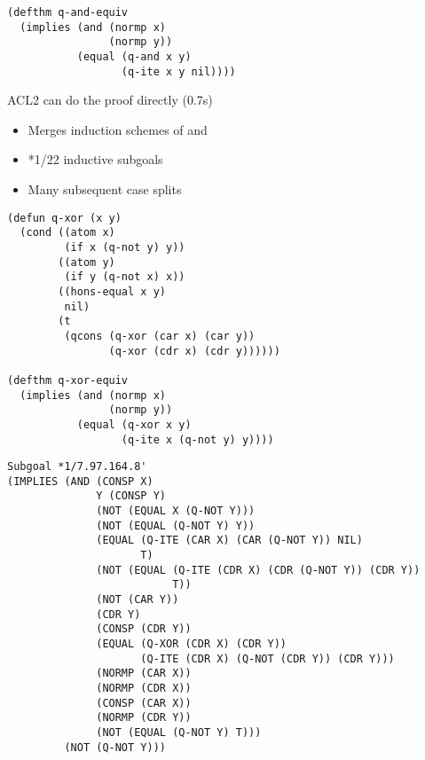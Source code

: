 \begin{frame}[fragile]
\begin{verbatim}
(defthm q-and-equiv
  (implies (and (normp x)
                (normp y))
           (equal (q-and x y)
                  (q-ite x y nil))))
\end{verbatim}
ACL2 can do the proof directly (0.7s)
\begin{itemize}
\item Merges induction schemes of  and 
\item *1/22 inductive subgoals
\item Many subsequent case splits
\end{itemize}


\end{frame}

\begin{frame}[fragile]
\begin{verbatim}
(defun q-xor (x y)
  (cond ((atom x)
         (if x (q-not y) y))
        ((atom y)
         (if y (q-not x) x))
        ((hons-equal x y)
         nil)
        (t
         (qcons (q-xor (car x) (car y))
                (q-xor (cdr x) (cdr y))))))

(defthm q-xor-equiv
  (implies (and (normp x)
                (normp y))
           (equal (q-xor x y)
                  (q-ite x (q-not y) y))))
\end{verbatim}
\end{frame}

\begin{frame}[fragile]
\small{\begin{verbatim}
Subgoal *1/7.97.164.8'
(IMPLIES (AND (CONSP X)
              Y (CONSP Y)
              (NOT (EQUAL X (Q-NOT Y)))
              (NOT (EQUAL (Q-NOT Y) Y))
              (EQUAL (Q-ITE (CAR X) (CAR (Q-NOT Y)) NIL)
                     T)
              (NOT (EQUAL (Q-ITE (CDR X) (CDR (Q-NOT Y)) (CDR Y))
                          T))
              (NOT (CAR Y))
              (CDR Y)
              (CONSP (CDR Y))
              (EQUAL (Q-XOR (CDR X) (CDR Y))
                     (Q-ITE (CDR X) (Q-NOT (CDR Y)) (CDR Y)))
              (NORMP (CAR X))
              (NORMP (CDR X))
              (CONSP (CAR X))
              (NORMP (CDR Y))
              (NOT (EQUAL (Q-NOT Y) T)))
         (NOT (Q-NOT Y)))
\end{verbatim}}
\end{frame}


